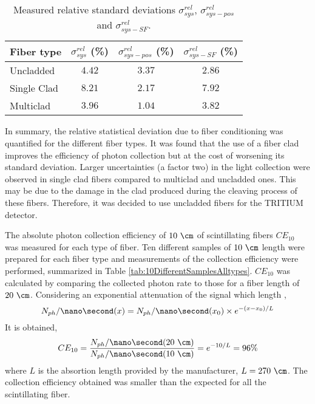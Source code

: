 \begin{table}[htbp]
\centering{}%
\begin{tabular}{lccc}
\toprule 
Fiber type & $\sigma^{rel}_{sys}$ (\%) & $\sigma^{rel}_{sys-pos}$ (\%) & $\sigma^{rel}_{sys-SF}$ (\%) \tabularnewline
\midrule
\midrule 
Uncladded & $4.42$ & $3.37$ & $2.86$ \tabularnewline
Single Clad & $8.21$ & $2.17$ & $7.92$ \tabularnewline
Multiclad & $3.96$ & $1.04$ & $3.82$ \tabularnewline
\bottomrule
\end{tabular}
\caption{Measured relative standard deviations $\sigma^{rel}_{sys}$, $\sigma^{rel}_{sys-pos}$ and $\sigma^{rel}_{sys-SF}$.}
\label{tab:RelativeStandardDeviations}
\end{table}

In summary, the relative statistical deviation due to fiber conditioning was quantified for the different fiber types. It was found that the use of a fiber clad improves the efficiency of photon collection but at the cost of worsening its standard deviation. Larger uncertainties (a factor two) in the light collection were observed in single clad fibers compared to multiclad and uncladded ones. This may be due to the damage in the clad produced during the cleaving process of these fibers. Therefore, it was decided to use uncladded fibers for the TRITIUM detector. 

The absolute photon collection efficiency of $10~\cm$ of scintillating fibers $CE_{10}$ was measured for each type of fiber. Ten different samples of $10~\cm$ length were prepared for each fiber type and measurements of the collection efficiency were performed, summarized in Table \ref{tab:10DifferentSamplesAlltypes}. $CE_{10}$ was calculated by comparing the collected photon rate to those for a fiber length of $20~\cm$. Considering an exponential attenuation of the signal which length \cite{Leo},
\begin{equation}
N_{ph}/\nano\second(x) = N_{ph}/\nano\second(x_0) \times e^{-(x-x_0)/L}
\label{eq:ExponentialAttenuation}
\end{equation}
It is obtained,
\begin{equation}
CE_{10}=\frac{N_{ph}/\nano\second(20~\cm)}{N_{ph}/\nano\second(10~\cm)}=e^{-10/L}=96\%
\label{eq:CollectionEfficiency}
\end{equation}
where $L$ is the absortion length provided by the manufacturer, $L=270~\cm$. The collection efficiency obtained was smaller than the expected for all the scintillating fiber.

